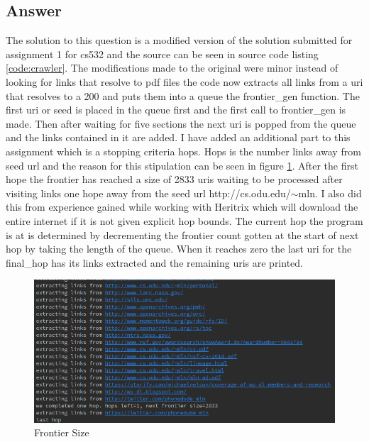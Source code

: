 \documentclass[a4paper,11pt]{article}
\newenvironment{code}{\captionsetup{type=listing}}{}
\begin{document}
\subsection{Answer}
\setcounter{listing}{1}
The solution to this question is a modified version of the solution submitted for assignment 1 for cs532 and the source can be seen in source code listing \hyperref[code:crawler]{\ref{code:crawler}}.
The modifications made to the original were minor instead of looking for links that resolve to pdf files the code now extracts all links from a uri that resolves to a 200 and puts them into a queue the frontier\_gen function.
The first uri or seed is placed in the queue first and the first call to frontier\_gen is made. Then after waiting for five sections the next uri is popped from the queue and the links contained in it are added. I have added an additional part to this assignment which is a stopping criteria hops. Hops is the number links away from seed url and the reason for this stipulation can be seen in figure \hyperref[fig:frontierSize]{\ref{fig:frontierSize}}. After the first hope the frontier has reached a size of 2833 uris waiting to be processed after visiting links one hope away from the seed url http://cs.odu.edu/$\sim$mln. I also did this from experience gained while working with Heritrix which will download the entire internet if it is not given explicit hop bounds.
The current hop the program is at is determined by decrementing the frontier count gotten at the start of next hop by taking the length of the queue. When it reaches zero the last uri for the final\_hop has its links extracted and the remaining uris are printed. 
\begin{figure}[h]
\includegraphics[scale=0.5]{crawlerOutput.png}
\caption{Frontier Size}
\label{fig:frontierSize}
\end{figure}
\begin{code}
\label{code:crawler}
\end{code}
\newpage
\clearpage

\end{document}
